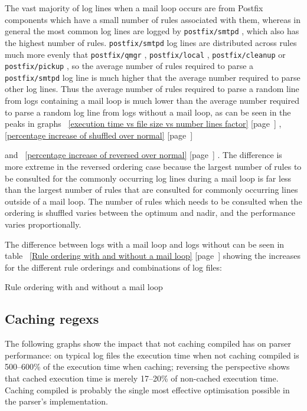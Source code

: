 \documentclass[a4paper,12pt,draft]{article}
\newcommand{\showtable}[3]{
    \begin{table}[ht]
        \caption{#2}\label{#3}
        
    \end{table}
}
\newcommand{\refwithpage}[1]{%
    \empty{}\ref{#1} [page~\pageref{#1}]%
}
\newcommand{\daemon}[1]{%
    \texttt{postfix/#1}%
}
\begin{document}
The vast majority of log lines when a mail loop occurs are from Postfix
components which have a small number of rules associated with them, whereas
in general the most common log lines are logged by \daemon{smtpd}, which
also has the highest number of rules.  \daemon{smtpd} log lines are
distributed across rules much more evenly that \daemon{qmgr},
\daemon{local}, \daemon{cleanup} or \daemon{pickup}, so the average number
of rules required to parse a \daemon{smtpd} log line is much higher that
the average number required to parse other log lines.  Thus the average
number of rules required to parse a random line from logs containing a mail
loop is much lower than the average number required to parse a random log
line from logs without a mail loop, as can be seen in the peaks in
graphs~\refwithpage{execution time vs file size vs number lines
factor},~\refwithpage{percentage increase of shuffled over normal}
and~\refwithpage{percentage increase of reversed over normal}.  The
difference is more extreme in the reversed ordering case because the
largest number of rules to be consulted for the commonly occurring log
lines during a mail loop is far less than the largest number of rules that
are consulted for commonly occurring lines outside of a mail loop.  The
number of rules which needs to be consulted when the ordering is shuffled
varies between the optimum and nadir, and the performance varies
proportionally.

The difference between logs with a mail loop and logs without can be seen
in table~\refwithpage{Rule ordering with and without a mail loop} showing
the increases for the different rule orderings and combinations of log
files:

\showtable{build/stats-normal-shuffle-reverse-include}{Rule ordering with
and without a mail loop}{Rule ordering with and without a mail loop}



\subsection{Caching regexs}

The following graphs show the impact that not caching compiled \regexs{}
has on parser performance: on typical log files the execution time when not
caching compiled \regexs{} is 500--600\% of the execution time when
caching; reversing the perspective shows that cached execution time is
merely 17--20\% of non-cached execution time.  Caching compiled \regexs{}
is probably the single most effective optimisation possible in the parser's
implementation.
\end{document}
